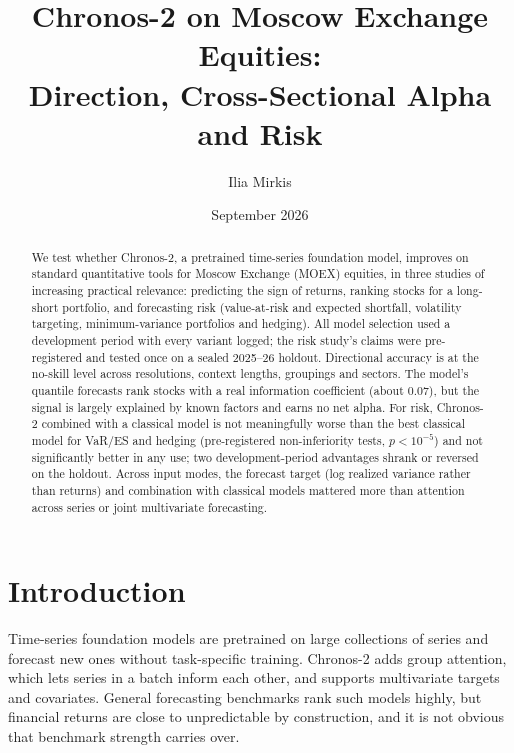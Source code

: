 \documentclass[11pt]{article}
\title{Chronos-2 on Moscow Exchange Equities:\\Direction, Cross-Sectional Alpha and Risk}
\author{Ilia Mirkis}
\date{September 2026}
\begin{document}
\maketitle

\begin{abstract}
\noindent
We test whether Chronos-2, a pretrained time-series foundation model, improves on standard quantitative tools
for Moscow Exchange (MOEX) equities, in three studies of increasing practical relevance: predicting the sign of
returns, ranking stocks for a long-short portfolio, and forecasting risk (value-at-risk and expected shortfall,
volatility targeting, minimum-variance portfolios and hedging). All model selection used a development period
with every variant logged; the risk study's claims were pre-registered and tested once on a sealed 2025--26
holdout. Directional accuracy is at the no-skill level across resolutions, context lengths, groupings and
sectors. The model's quantile forecasts rank stocks with a real information coefficient (about 0.07), but the
signal is largely explained by known factors and earns no net alpha. For risk, Chronos-2 combined with a
classical model is not meaningfully worse than the best classical model for VaR/ES and hedging
(pre-registered non-inferiority tests, $p < 10^{-5}$) and not significantly better in any use; two development-period advantages shrank or reversed on
the holdout. Across input modes, the forecast target (log realized variance rather than returns) and combination
with classical models mattered more than attention across series or joint multivariate forecasting.
\end{abstract}

\section{Introduction}

Time-series foundation models are pretrained on large collections of series and forecast new ones without
task-specific training. Chronos-2 \citep{ansari2025chronos2} adds group attention, which lets series in a batch
inform each other, and supports multivariate targets and covariates. General forecasting benchmarks rank such
models highly, but financial returns are close to unpredictable by construction, and it is not obvious that
benchmark strength carries over.
\end{document}
